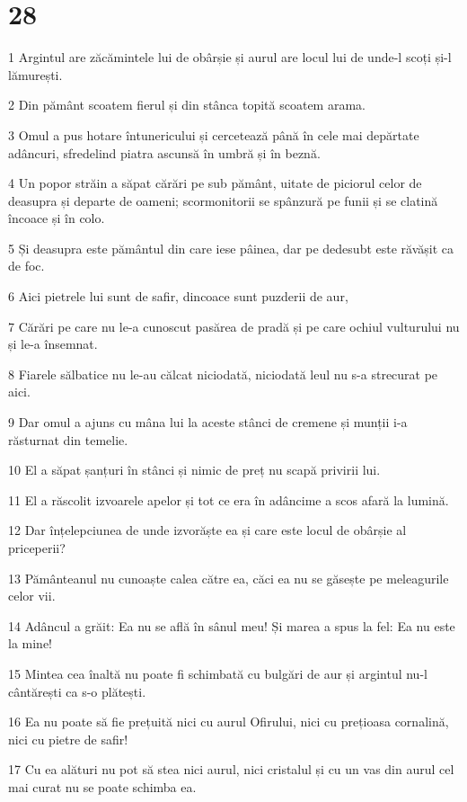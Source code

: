 \chapter{28}

\par 1 Argintul are zăcămintele lui de obârșie și aurul are locul lui de unde-l scoți și-l lămurești.
\par 2 Din pământ scoatem fierul și din stânca topită scoatem arama.
\par 3 Omul a pus hotare întunericului și cercetează până în cele mai depărtate adâncuri, sfredelind piatra ascunsă în umbră și în beznă.
\par 4 Un popor străin a săpat cărări pe sub pământ, uitate de piciorul celor de deasupra și departe de oameni; scormonitorii se spânzură pe funii și se clatină încoace și în colo.
\par 5 Și deasupra este pământul din care iese pâinea, dar pe dedesubt este răvășit ca de foc.
\par 6 Aici pietrele lui sunt de safir, dincoace sunt puzderii de aur,
\par 7 Cărări pe care nu le-a cunoscut pasărea de pradă și pe care ochiul vulturului nu și le-a însemnat.
\par 8 Fiarele sălbatice nu le-au călcat niciodată, niciodată leul nu s-a strecurat pe aici.
\par 9 Dar omul a ajuns cu mâna lui la aceste stânci de cremene și munții i-a răsturnat din temelie.
\par 10 El a săpat șanțuri în stânci și nimic de preț nu scapă privirii lui.
\par 11 El a răscolit izvoarele apelor și tot ce era în adâncime a scos afară la lumină.
\par 12 Dar înțelepciunea de unde izvorăște ea și care este locul de obârșie al priceperii?
\par 13 Pământeanul nu cunoaște calea către ea, căci ea nu se găsește pe meleagurile celor vii.
\par 14 Adâncul a grăit: Ea nu se află în sânul meu! Și marea a spus la fel: Ea nu este la mine!
\par 15 Mintea cea înaltă nu poate fi schimbată cu bulgări de aur și argintul nu-l cântărești ca s-o plătești.
\par 16 Ea nu poate să fie prețuită nici cu aurul Ofirului, nici cu prețioasa cornalină, nici cu pietre de safir!
\par 17 Cu ea alături nu pot să stea nici aurul, nici cristalul și cu un vas din aurul cel mai curat nu se poate schimba ea.
